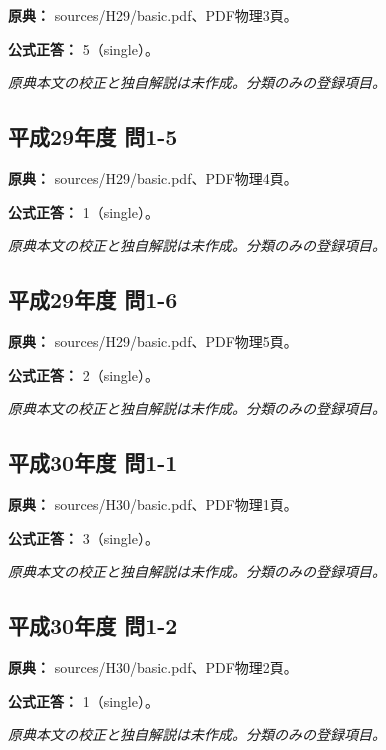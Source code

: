 \noindent\textbf{原典：} sources/H29/basic.pdf、PDF物理3頁。

\textbf{公式正答：} 5（single）。

\par\textit{原典本文の校正と独自解説は未作成。分類のみの登録項目。}

\subsection{平成29年度 問1-5}
\label{q:h29-reg-basic-1-5}

\noindent\textbf{原典：} sources/H29/basic.pdf、PDF物理4頁。

\textbf{公式正答：} 1（single）。

\par\textit{原典本文の校正と独自解説は未作成。分類のみの登録項目。}

\subsection{平成29年度 問1-6}
\label{q:h29-reg-basic-1-6}

\noindent\textbf{原典：} sources/H29/basic.pdf、PDF物理5頁。

\textbf{公式正答：} 2（single）。

\par\textit{原典本文の校正と独自解説は未作成。分類のみの登録項目。}

\subsection{平成30年度 問1-1}
\label{q:h30-reg-basic-1-1}

\noindent\textbf{原典：} sources/H30/basic.pdf、PDF物理1頁。

\textbf{公式正答：} 3（single）。

\par\textit{原典本文の校正と独自解説は未作成。分類のみの登録項目。}

\subsection{平成30年度 問1-2}
\label{q:h30-reg-basic-1-2}

\noindent\textbf{原典：} sources/H30/basic.pdf、PDF物理2頁。

\textbf{公式正答：} 1（single）。

\par\textit{原典本文の校正と独自解説は未作成。分類のみの登録項目。}

